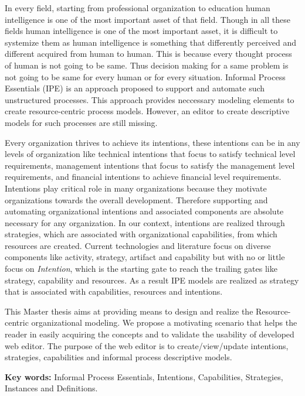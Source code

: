 \documentclass[
               fontsize=12pt, %
               paper=a4,
               twoside, %
               BCOR=3mm, %
               DIV=13,   %
               headinclude=true,
               footinclude=false,
               bibliography=totoc,
               headsepline,
               cleardoublepage=empty,
               parskip=half,
               pointlessnumbers, %
               final   %
               ]{scrbook}
\begin{document}
In every field, starting from professional organization to education human intelligence is one of the most important asset of that field. Though in all these fields human intelligence is one of the most important asset, it is difficult to systemize them as human intelligence is something that differently perceived and different acquired from human to human. This is because every thought process of human is not going to be same. Thus decision making for a same problem is not going to be same for every human or for every situation. Informal Process Essentials (IPE) is an approach proposed to support and automate such unstructured processes. This approach provides neccessary modeling elements to create resource-centric process models. However, an editor to create descriptive models for such processes are still missing. 

Every organization thrives to achieve its intentions, these intentions can be in any levels of  organization like technical intentions that focus to satisfy technical level requirements, management intentions that focus to satisfy the management level requirements, and financial intentions to achieve financial level requirements. Intentions play critical role in many organizations because they motivate organizations towards the overall development. Therefore supporting and automating organizational intentions and associated components are absolute necessary for any organization. In our context, intentions are realized through strategies, which are associated with organizational capabilities, from which resources are created. Current technologies and literature focus on diverse components  like activity, strategy, artifact and capability but with no or little focus on \textit{Intention}, which is the starting gate to reach the  trailing gates like strategy, capability and resources. As a result IPE models are realized as strategy that is associated with capabilities, resources and intentions.  

This Master thesis aims at providing means to design and realize the Resource-centric organizational modeling. We propose a motivating scenario that helps the reader in easily acquiring the concepts and to validate the usability of developed web editor. The purpose of the web editor is to create/view/update intentions, strategies, capabilities and informal process descriptive models. 


\textbf{Key words:} Informal Process Essentials, Intentions, Capabilities, Strategies, Instances and Definitions. 
\end{document}
